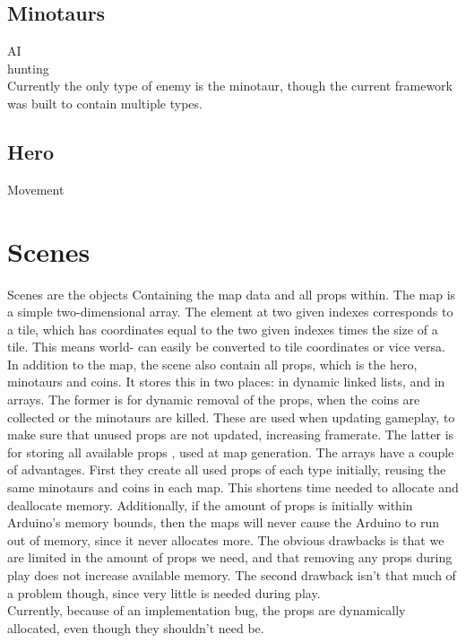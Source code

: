 \subsection{Minotaurs}
AI\\
hunting\\
Currently the only type of enemy is the minotaur, though the current framework was built to contain multiple types.


\subsection{Hero}
Movement

\section{Scenes} %
Scenes are the objects Containing the map data and all props within. The map is a simple two-dimensional array. The element at two given indexes corresponds to a tile, which has coordinates equal to the two given indexes times the size of a tile. This means world- can easily be converted to tile coordinates or vice versa.\\
In addition to the map, the scene also contain all props, which is the hero, minotaurs and coins. It stores this in two places: in dynamic linked lists, and in arrays. The former is for dynamic removal of the props, when the coins are collected or the minotaurs are killed. These are used when updating gameplay, to make sure that unused props are not updated, increasing framerate. The latter is for storing all available props , used at map generation. The arrays have a couple of advantages. First they create all used props of each type initially, reusing the same minotaurs and coins in each map. This shortens time needed to allocate and deallocate memory. Additionally, if the amount of props is initially within Arduino's memory bounds, then the maps will never cause the Arduino to run out of memory, since it never allocates more. The obvious drawbacks is that we are limited in the amount of props we need, and that removing any props during play does not increase available memory. The second drawback isn't that much of a problem though, since very little is needed during play.\\
Currently, because of an implementation bug, the props are dynamically allocated, even though they shouldn't need be.

